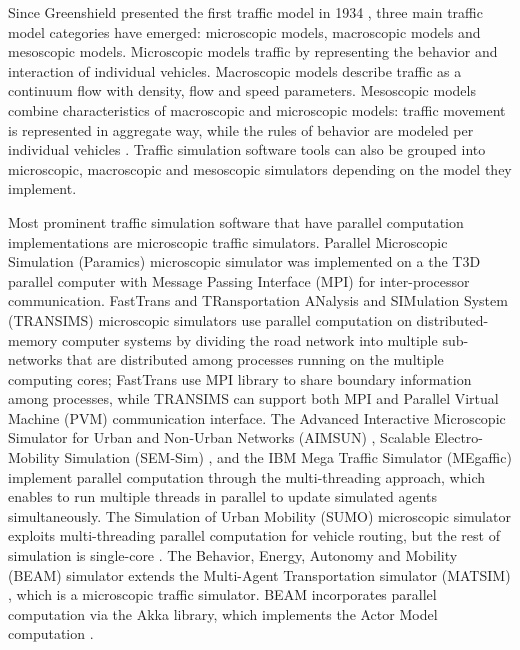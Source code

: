 Since Greenshield presented the first traffic model in 1934 \cite{greenshields1934photographic}, three main traffic model categories have emerged: microscopic models, macroscopic models and mesoscopic models. Microscopic models traffic by representing the behavior and interaction of individual vehicles. Macroscopic models describe traffic as a continuum flow with density, flow and speed parameters. Mesoscopic models combine characteristics of macroscopic and microscopic models: traffic movement is represented in aggregate way, while the rules of behavior are modeled per individual vehicles \cite{van2015traffic}. Traffic simulation software tools can also be grouped into microscopic, macroscopic and mesoscopic simulators depending on the model they implement. 

Most prominent traffic simulation software that have parallel computation implementations are microscopic traffic simulators. Parallel Microscopic Simulation (Paramics) \cite{cameron1996paramics} microscopic simulator was implemented on a the T3D parallel computer with Message Passing Interface (MPI) for inter-processor communication. FastTrans \cite{thulasidasan2009accelerating} and TRansportation ANalysis and SIMulation System (TRANSIMS) \cite{nagel2001parallel} microscopic simulators use parallel computation on distributed-memory
computer systems by dividing the road network into multiple sub-networks that are distributed among processes running on the multiple computing cores; FastTrans use MPI library to share boundary information among processes, while TRANSIMS can support
both MPI and Parallel Virtual Machine (PVM) communication interface. The Advanced Interactive Microscopic Simulator for Urban and Non-Urban Networks (AIMSUN) \cite{ferrer1993aimsun2}, Scalable Electro-Mobility Simulation (SEM-Sim) \cite{aydt2013multi}, and the IBM Mega Traffic Simulator (MEgaffic) \cite{osogami2012research} implement parallel computation through the multi-threading approach, which enables to run multiple threads in parallel to update simulated agents simultaneously. The Simulation of Urban Mobility (SUMO) microscopic simulator
exploits multi-threading parallel computation for vehicle routing,
but the rest of simulation is single-core \cite{behrisch2011sumo}.
The Behavior, Energy, Autonomy and Mobility (BEAM) simulator \cite{aboutBeam} extends the Multi-Agent Transportation simulator (MATSIM) \cite{horni2016multi}, which is a microscopic traffic simulator. BEAM incorporates parallel computation via the Akka \cite{akka} library, which implements the Actor Model computation \cite{actorModel}. 


